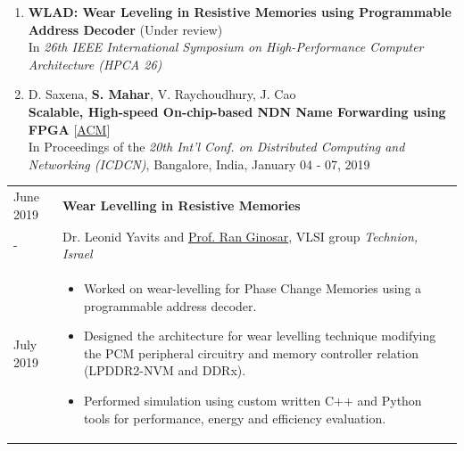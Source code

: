 \documentclass{article}
\newlength{\workexitemsep}
\newlength{\sectionbottommargin}
\newlength{\workexitemsep}
\newenvironment{nothing}{}
\newcommand{\sectiontitle}[1]{
  \textbf{\Large{\sffamily #1}}
  \begin{center}
    \vspace{-0.55cm} 
    \rule{0.945\textwidth}{1.1pt} 
  \end{center}
  \vspace{-0.1cm} 
}
\begin{document}
    \vspace{-3mm}
    \begin{nothing}
    \vspace{\sectionbottommargin} 
    
    \ifdefined\resume
        \vspace{-0.2cm} 
    \fi 

    \begin{enumerate}
        \ifdefined\cv
        \item %
                \textbf{WLAD: Wear Leveling in Resistive Memories using Programmable Address Decoder} (Under review)\\
                {\footnotesize In \textit{26th IEEE International Symposium on High-Performance Computer Architecture (HPCA 26)} }%
        \fi
        \item D. Saxena, \textbf{S. Mahar}, V. Raychoudhury, J. Cao\\
                \textbf{Scalable, High-speed On-chip-based NDN Name Forwarding using FPGA} [\href{https://doi.org/10.1145/3288599.3288613}{ACM}]\\
                {\footnotesize In Proceedings of the \textit{20th Int'l Conf. on Distributed Computing and Networking (ICDCN)}, Bangalore, India, January 04 - 07, 2019}
    \end{enumerate}
    \end{nothing}
  
    
    \ifdefined\resume
        \vspace{-0.2cm} 
    \fi 
    
    \begin{tabular}{p{} p{}}
        \centering June 2019       & \textbf{Wear Levelling in Resistive Memories} \\
        \centering -              & Dr. Leonid Yavits and \href{http://webee.technion.ac.il/~ran/}{Prof. Ran Ginosar}, VLSI group \hfill \textit{Technion, Israel}\\ 
        \centering July 2019      & \vspace{-0.6cm}\begin{itemize}[itemsep=\workexitemsep] 
        \item Worked on wear-levelling for Phase Change Memories using a programmable address decoder.
        \item Designed the architecture for wear levelling technique modifying the PCM peripheral circuitry and memory controller relation (LPDDR2-NVM and DDRx).
        \item Performed simulation using custom written C++ and Python tools for performance, energy and efficiency evaluation.
    \end{itemize}
    \end{tabular}  
    
\end{document}
